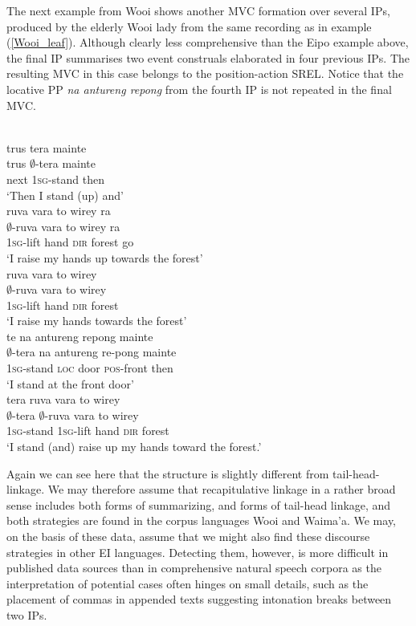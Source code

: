 The next example from Wooi shows another MVC formation over several IPs, produced by the elderly Wooi lady from the same recording as in example (\ref{Wooi_leaf}). Although clearly less comprehensive than the Eipo example above, the final IP summarises two event construals elaborated in four previous IPs. The resulting MVC in this case belongs to the position-action SREL. Notice that the locative PP \textit{na antureng repong} from the fourth IP is not repeated in the final MVC.

\ea 
{}\\
\ea
\glll trus tera mainte \\
trus $\emptyset$-tera mainte \\
next \textsc{1}\textsc{sg}-stand then \\
\glft `Then I stand (up) and'\\ 
\ex
\glll ruva vara to wirey ra \\
$\emptyset$-ruva vara to wirey ra \\
\textsc{1}\textsc{sg}-lift hand \textsc{dir} forest go \\
\glft `I raise my hands up towards the forest'\\ 
\ex
\glll ruva vara to wirey \\
$\emptyset$-ruva vara to wirey \\
\textsc{1}\textsc{sg}-lift hand \textsc{dir} forest \\
\glft `I raise my hands towards the forest'\\ 
\ex
\glll te na antureng repong mainte \\
$\emptyset$-tera na antureng re-pong mainte \\
\textsc{1}\textsc{sg}-stand \textsc{loc} door \textsc{pos}-front then \\
\glft `I stand at the front door'\\ 
\ex
\glll tera ruva vara to wirey \\
$\emptyset$-tera $\emptyset$-ruva vara to wirey \\
\textsc{1}\textsc{sg}-stand \textsc{1}\textsc{sg}-lift hand \textsc{dir} forest \\
\glft `I stand (and) raise up my hands toward the forest.'\\ 
\z
\z

Again we can see here that the structure is slightly different from tail-head-linkage. We may therefore assume that recapitulative linkage in a rather broad sense includes both forms of summarizing, and forms of tail-head linkage, and both strategies are found in the corpus languages Wooi and Waima'a. We may, on the basis of these data, assume that we might also find these discourse strategies in other EI languages. Detecting them, however, is more difficult in published data sources than in comprehensive natural speech corpora as the interpretation of potential cases often hinges on small details, such as the placement of commas in appended texts suggesting intonation breaks between two IPs.

